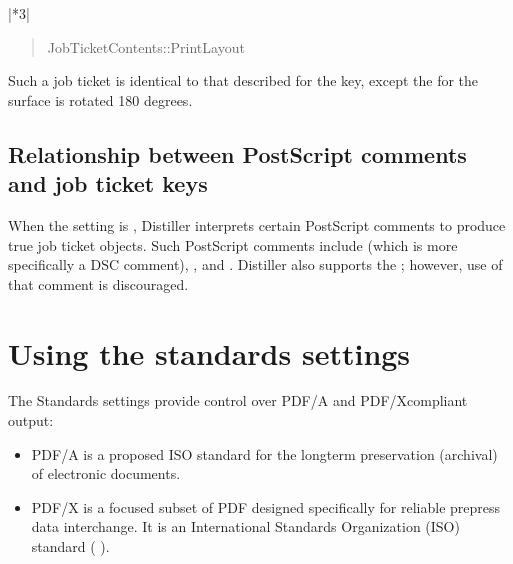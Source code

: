 \documentclass[letterpaper,12pt,english,openany,oneside]{sphinxmanual}
\begin{document}
\begin{savenotes}
\begin{tabular}[t]{|*{3}{|}}
\begin{quote}
JobTicketContents::PrintLayout
\end{quote}

Such a job ticket is identical to that described for the  key, except the  for the  surface is rotated 180 degrees.
\\
\hline
\end{tabular}
\par
\sphinxattableend\end{savenotes}


\subsection{Relationship between PostScript comments and job ticket keys}
\label{\detokenize{PDF_Create_UsingSettings:relationship-between-postscript-comments-and-job-ticket-keys}}
When the  setting is  , Distiller interprets certain PostScript comments to produce true job ticket  objects. Such PostScript comments include  (which is more specifically a DSC comment),  , and  . Distiller also supports the  ; however, use of that comment is discouraged.




\section{Using the standards settings}
\label{\detokenize{PDF_Create_UsingSettings:using-the-standards-settings}}
The Standards settings provide control over PDF/A\sphinxhyphen{} and PDF/X\sphinxhyphen{}compliant output:
\begin{itemize}
\item {} 
PDF/A is a proposed ISO standard for the long\sphinxhyphen{}term preservation (archival) of electronic documents.

\item {} 
PDF/X is a focused subset of PDF designed specifically for reliable prepress data interchange. It is an International Standards Organization (ISO) standard (  ).

\end{itemize}
\end{document}
